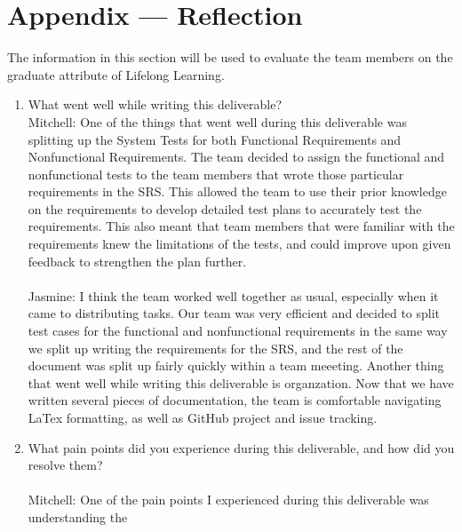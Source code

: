 \documentclass[12pt, titlepage]{article}
\begin{document}
\newpage{}
\section*{Appendix --- Reflection}


The information in this section will be used to evaluate the team members on the
graduate attribute of Lifelong Learning.



\begin{enumerate}
  \item What went well while writing this deliverable?\\
  \newline
  \hspace{2em} Mitchell: One of the things that went well during this deliverable was splitting up
  the System Tests for both Functional Requirements and Nonfunctional Requirements. The team decided
  to assign the functional and nonfunctional tests to the team members that wrote those particular
  requirements in the SRS. This allowed the team to use their prior knowledge on the requirements
  to develop detailed test plans to accurately test the requirements. This also meant that team members
  that were familiar with the requirements knew the limitations of the tests, and could improve upon
  given feedback to strengthen the plan further.\\\\
  \hspace{2em} Jasmine: I think the team worked well together as usual, especially when it came to 
  distributing tasks. Our team was very efficient and decided to split test cases for the functional and 
  nonfunctional requirements in the same way we split up writing the requirements for the SRS, and the 
  rest of the document was split up fairly quickly within a team meeeting. Another thing that went well 
  while writing this deliverable is organzation. Now that we have written several pieces of documentation, 
  the team is comfortable navigating LaTex formatting, as well as GitHub project and issue tracking.\\
  \item What pain points did you experience during this deliverable, and how
    did you resolve them?\\\\
  \newline
  \hspace{2em} Mitchell: One of the pain points I experienced during this deliverable was understanding the

\end{enumerate}
\end{document}
